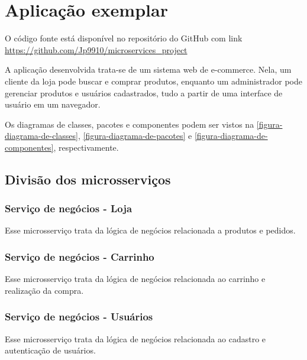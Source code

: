 \chapter{Aplicação exemplar}\label{chapter-aplicacao}


O código fonte está disponível no repositório do GitHub com link \url{https://github.com/Jp9910/microservices_project}

A aplicação desenvolvida trata-se de um sistema web de e-commerce. Nela, um cliente da loja pode buscar e comprar produtos, enquanto um administrador pode gerenciar produtos e usuários cadastrados, tudo a partir de uma interface de usuário em um navegador.

Os diagramas de classes, pacotes e componentes podem ser vistos na \autoref{figura-diagrama-de-classes}, \autoref{figura-diagrama-de-pacotes} e \autoref{figura-diagrama-de-componentes}, respectivamente.

\section{Divisão dos microsserviços}

\subsection*{Serviço de negócios - Loja}
Esse microsserviço trata da lógica de negócios relacionada a produtos e pedidos.

\subsection*{Serviço de negócios - Carrinho}
Esse microsserviço trata da lógica de negócios relacionada ao carrinho e realização da compra.

\subsection*{Serviço de negócios - Usuários}
Esse microsserviço trata da lógica de negócios relacionada ao cadastro e autenticação de usuários.

